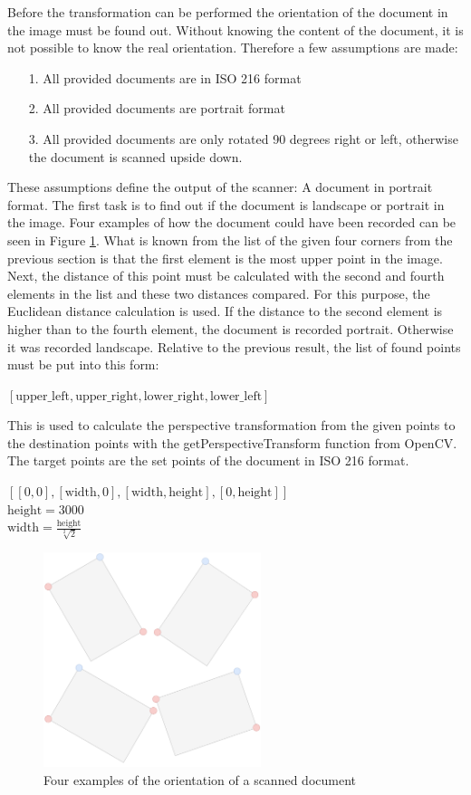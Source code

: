 \documentclass[twocolumn,10pt]{asme2ej}
\newcommand*\redcircled[1]{\tikz[baseline=(char.base)]{
            \node[shape=circle,draw,inner sep=2pt, fill=red!40] (char) {#1};}}
\newcommand*\bluecircled[1]{\tikz[baseline=(char.base)]{
            \node[shape=circle,draw,inner sep=2pt, fill=blue!40] (char) {#1};}}
\begin{document}
Before the transformation can be performed the orientation of the document in the image must be found out.
Without knowing the content of the document, it is not possible to know the real orientation. Therefore a few assumptions are made:
\begin{itemize}
    \item[1.] All provided documents are in ISO 216 format
    \item[2.] All provided documents are portrait format
    \item[3.] All provided documents are only rotated 90 degrees right or left, otherwise the document is scanned upside down.
\end{itemize}
These assumptions define the output of the scanner: A document in portrait format.
The first task is to find out if the document is landscape or portrait in the image.
Four examples of how the document could have been recorded can be seen in Figure \ref{fig:fourcorners}.
What is known from the list of the given four corners from the previous section is that the first element \bluecircled{-} is the most upper point in the image. 
Next, the distance of this point must be calculated with the second and fourth elements \redcircled{-} in the list and these two distances compared. For this purpose, the Euclidean distance calculation is used. If the distance to the second element is higher than to the fourth element, the document is recorded portrait. Otherwise it was recorded landscape. 
Relative to the previous result, the list of found points must be put into this form:
\begin{center}
    $[\textrm{upper\_left}, \textrm{upper\_right}, \textrm{lower\_right}, \textrm{lower\_left}]$
\end{center}
This is used to calculate the perspective transformation from the given points to the destination points with the getPerspectiveTransform\cite{opencv_getPerspectiveTransform} function from OpenCV. 
The target points are the set points of the document in ISO 216 format.
\begin{center}
    $[[0,0], [\textrm{width},0], [\textrm{width},\textrm{height}], [0,\textrm{height}]]$\\
    $\textrm{height}=3000$\\
    $\textrm{width}=\frac{\textrm{height}}{\sqrt[2]{2}}$
\end{center}
\begin{figure}[H]
    \centerline{\includegraphics[width=2.5in]{output/a.png}}
    \caption{Four examples of the orientation of a scanned document}
    \label{fig:fourcorners}
\end{figure}
\end{document}
